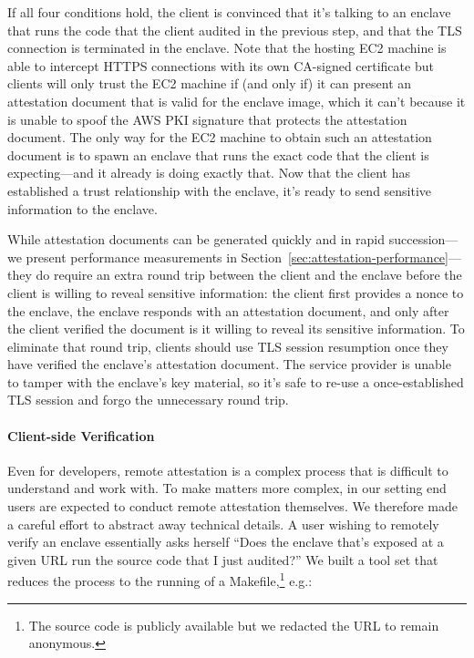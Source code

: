 If all four conditions hold, the client is convinced that it's talking to an
enclave that runs the code that the client audited in the previous step, and
that the TLS connection is terminated in the enclave.  Note that the hosting EC2
machine is able to intercept HTTPS connections with its own CA-signed
certificate but clients will only trust the EC2 machine if (and only if) it can
present an attestation document that is valid for the enclave image, which it
can't because it is unable to spoof the AWS PKI signature that protects the
attestation document.  The only way for the EC2 machine to obtain such an
attestation document is to spawn an enclave that runs the exact code that the
client is expecting---and it already is doing exactly that.  Now that the client
has established a trust relationship with the enclave, it's ready to send
sensitive information to the enclave.

While attestation documents can be generated quickly and in rapid
succession---we present performance measurements in
Section~\ref{sec:attestation-performance}---they do require an extra round trip
between the client and the enclave before the client is willing to reveal
sensitive information: the client first provides a nonce to the enclave, the
enclave responds with an attestation document, and only after the client verified
the document is it willing to reveal its sensitive information.  To eliminate
that round trip, clients should use TLS session resumption once they have
verified the enclave's attestation document.  The service provider is unable to
tamper with the enclave's key material, so it's safe to re-use a
once-established TLS session and forgo the unnecessary round trip.

\paragraph{Client-side Verification}

Even for developers, remote attestation is a complex process that is difficult
to understand and work with.  To make matters more complex, in our setting end
users are expected to conduct remote attestation themselves.  We therefore made
a careful effort to abstract away technical details.  A user wishing to remotely
verify an enclave essentially asks herself ``Does the enclave that's exposed at
a given URL run the source code that I just audited?''  We built a tool set that
reduces the process to the running of a Makefile,\footnote{The source code is
publicly available but we redacted the URL to remain anonymous.} e.g.:

